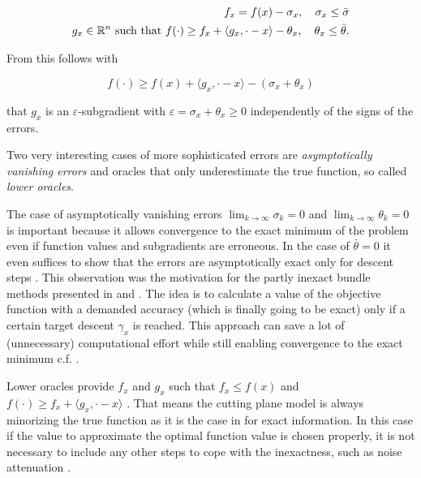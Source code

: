 \begin{equation}
\begin{split}
	f_x = f(x)-\sigma_x, \quad \sigma_x \leq \bar{\sigma} \\
	g_x \in \mathbb{R}^n \text{ such that } f(\cdot) \geq f_x + \langle g_x, \cdot - x \rangle - \theta_x, \quad \theta_x \leq \bar{\theta}.
	\label{conv_inexactness}
\end{split}
\end{equation}

From this follows with 

\begin{equation}
	f(\cdot) \geq f(x)+\langle g_x, \cdot - x \rangle - (\sigma_x+\theta_x)
\end{equation}

that \(g_x\) is an \(\varepsilon\)-subgradient with \(\varepsilon = \sigma_x+\theta_x \geq 0\) independently of the signs of the errors.

Two very interesting cases of more sophisticated errors are \emph{asymptotically vanishing errors} and oracles that only underestimate the true function, so called \emph{lower oracles}.

The case of asymptotically vanishing errors \(\lim_{k \to \infty} \sigma_k = 0\) and \(\lim_{k \to \infty} \theta_k =  0\) is important because it allows convergence to the exact minimum of the problem even if function values and subgradients are erroneous. In the case of \(\bar{\theta} = 0\) it even suffices to show that the errors are asymptotically exact only for descent steps \cite{Kiwiel2010}.
This observation was the motivation for the partly inexact bundle methods presented in \cite{Kiwiel2010} and \cite{Oliveira2014}.
The idea is to calculate a value of the objective function with a demanded accuracy (which is finally going to be exact) only if a certain target descent \(\gamma_x\) is reached. This approach can save a lot of (unnecessary) computational effort while still enabling convergence to the exact minimum c.f. \cite{Oliveira2014}.

Lower oracles provide \(f_x\) and \(g_x\) such that \(f_x \leq f(x) \) and \(f(\cdot) \geq f_x + \langle g_x, \cdot - x\rangle\) . That means the cutting plane model is always minorizing the true function as it is the case in for exact information.
In this case if the value to approximate the optimal function value is chosen properly, it is not necessary to include any other steps to cope with the inexactness, such as noise attenuation \cite[Corollary 5.2]{Oliveira2014}.

